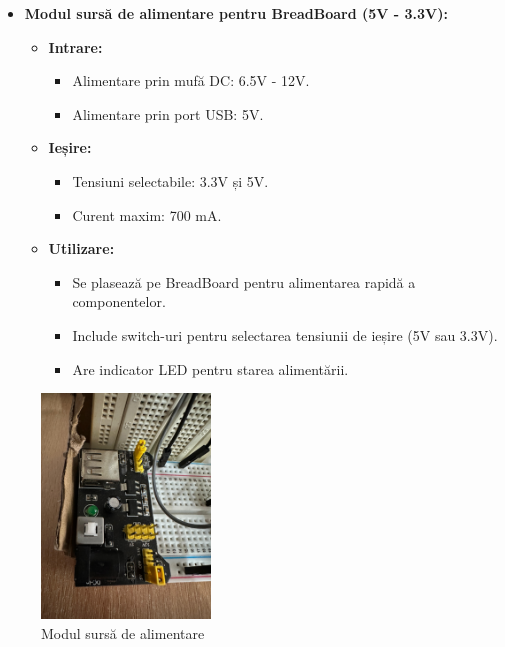 \documentclass{report}
\begin{document}
\begin{itemize}
    \item \textbf{Modul sursă de alimentare pentru BreadBoard (5V - 3.3V):}
    \begin{itemize}
        \item \textbf{Intrare:}
            \begin{itemize}
                \item Alimentare prin mufă DC: 6.5V - 12V.
                \item Alimentare prin port USB: 5V.
            \end{itemize}
        \item \textbf{Ieșire:}
            \begin{itemize}
                \item Tensiuni selectabile: 3.3V și 5V.
                \item Curent maxim: 700 mA.
            \end{itemize}
        \item \textbf{Utilizare:}
            \begin{itemize}
                \item Se plasează pe BreadBoard pentru alimentarea rapidă a componentelor.
                \item Include switch-uri pentru selectarea tensiunii de ieșire (5V sau 3.3V).
                \item Are indicator LED pentru starea alimentării.
            \end{itemize}
    \end{itemize}
\end{itemize}
\begin{figure}[H]
    \centering
    \includegraphics[width=0.4\textwidth]{power_supply.jpg}
    \caption{Modul sursă de alimentare}
    \label{fig:sursa}
\end{figure}
\end{document}
